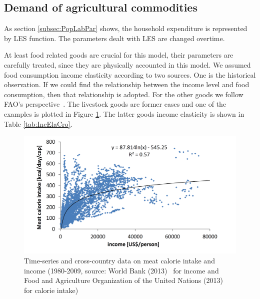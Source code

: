 \documentclass[10pt,a4paper,titlepage,dvipdfmx]{book}
\begin{document}
\begin{itemize}
\subsection{\label{subsec:DemAgrCom}Demand of agricultural commodities}

As section \ref{subsec:PopLabPar} shows, the household expenditure is represented by LES function. The parameters dealt with LES are changed overtime.

At least food related goods are crucial for this model, their parameters are carefully treated, since they are physically accounted in this model. We assumed food consumption income elasticity according to two sources. One is the historical observation. If we could find the relationship between the income level and food consumption, then that relationship is adopted. For the other goods we follow FAO's perspective~\cite{RN2725}. The livestock goods are former cases and one of the examples is plotted in Figure \ref{fig:MeatCal}. The latter goods income elasticity is shown in Table \ref{tab:IncElaCro}.
\begin{figure}
\includegraphics[width=1\textwidth]{fig/image21.png}
\caption{Time-series and cross-country data on meat calorie intake and income (1980-2009, source: World Bank (2013)~\cite{RN3647} for income and Food and Agriculture Organization of the United Nations (2013)~\cite{RN3272} for calorie intake)}
\label{fig:MeatCal}
\end{figure}


\end{itemize}
\end{document}
